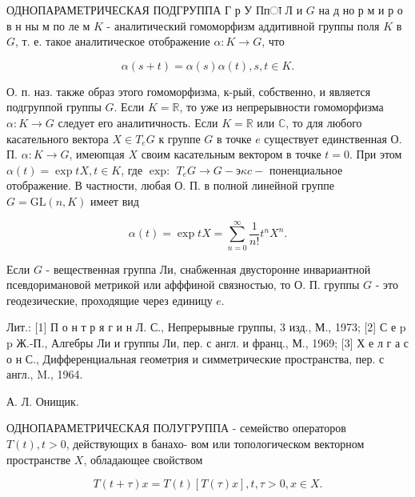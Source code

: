 \documentclass[10pt]{article}
\begin{document}
ОДНОПАРАМЕТРИЧЕСКАЯ ПОДГРУППА Г р У Ппा Л и $G$ на д но р м и р о в н ны м по ле м $K$ - аналитический гомоморфизм аддитивной группы поля $K$ в $G$, т. е. такое аналитическое отображение $\alpha: K \rightarrow G$, что



\[

\alpha(s+t)=\alpha(s) \alpha(t), s, t \in K .

\]



О. п. наз. также образ этого гомоморфизма, к-рый, собственно, и является подгруппой группы $G$. Если $K=\mathbb{R}$, то уже из непрерывности гомоморфизма $\alpha: K \rightarrow G$ следует его аналитичность. Если $K=\mathbb{R}$ или $\mathbb{C}$, то для любого касательного вектора $X \in T_{e} G$ к группе $G$ в точке $e$ существует единственная О. П. $\alpha: K \rightarrow G$, имеюпцая $X$ своим касательным вектором в точке $t=0$. При этом $\alpha(t)=\exp t X, t \in K$, где $\operatorname{exp:~} T_{e} G \rightarrow G-э \kappa c-$ поненциальное отображение. В частности, любая О. П. в полной линейной группе $G=\mathrm{GL}(n, K)$ имеет вид



\[

\alpha(t)=\exp t X=\sum_{n=0}^{\infty} \frac{1}{n !} t^{n} X^{n} .

\]



Если $G$ - вещественная группа Ли, снабженная двусторонне инвариантной псевдоримановой метрикой или афффиной связностью, то О. П. группы $G$ - это геодезические, проходящие через единицу $e$.



Лит.: [1] П о н т р я г и н Л. С., Непрерывные группы, 3 изд., М., 1973; [2] С е p p Ж.-П., Алгебры Ли и группы Ли, пер. с англ. и франц., М., 1969; [3] Х е л г а с о н С., Дифференциальная геометрия и симметрические пространства, пер. с англ., M., 1964.



А. Л. Онищик.



ОДНОПАРАМЕТРИЧЕСКАЯ ПОЛУГРУППА - семейство операторов $T(t), t>0$, действующих в банахо- вом или топологическом векторном пространстве $X$, обладающее свойством



\[

T(t+\tau) x=T(t)[T(\tau) x], t, \tau>0, x \in X .

\]
\end{document}

